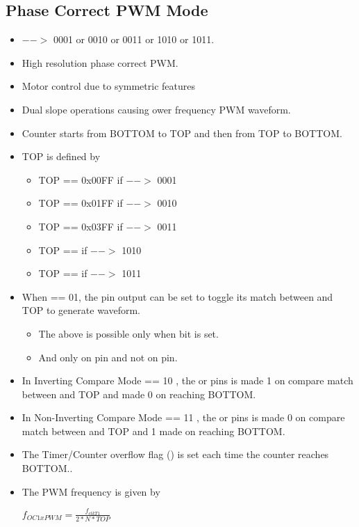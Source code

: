 \documentclass{article}
\begin{document}
\subsection{Phase Correct PWM Mode}
\begin{itemize}
    \item {} $-->$ 0001 or 0010 or 0011 or 1010 or 1011.    
    \item High resolution phase correct PWM.
    \item Motor control due to symmetric features
    \item Dual slope operations causing ower frequency PWM waveform.
    \item Counter starts from BOTTOM to TOP and then from TOP to BOTTOM.
    \item TOP is defined by
    \begin{itemize}
        \item TOP == 0x00FF if  $-->$ 0001
        \item TOP == 0x01FF if  $-->$ 0010
        \item TOP == 0x03FF if  $-->$ 0011
        \item TOP ==    if  $-->$ 1010
        \item TOP ==   if  $-->$ 1011
    \end{itemize}
    \item  When  == 01, the  pin output can be set to toggle its match between  and TOP to generate waveform.
    \begin{itemize}
        \item The above is possible only when  bit is set.
        \item And only on  pin and not on  pin.
    \end{itemize}
    \item In Inverting Compare Mode  == 10 , the  or  pins is made 1 on compare match between  and TOP and made 0 on reaching BOTTOM.
    \item In Non-Inverting Compare Mode  == 11 , the  or  pins is made 0 on compare match between  and TOP and 1 made  on reaching BOTTOM.
    \item The Timer/Counter overflow flag () is set each time the counter reaches BOTTOM..
    \item The PWM frequency is given by 
    \begin{center}
        { \Large $f_{OC1xPWM} = \frac{f_{clkT1}}{2 * N * TOP}$ }
    \end{center}
\end{itemize}
\end{document}
